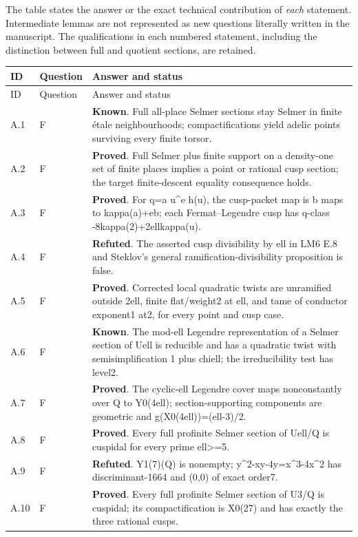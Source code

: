 The table states the answer or the exact technical contribution of
\emph{each} statement. Intermediate lemmas are not represented as new
questions literally written in the manuscript. The qualifications in
each numbered statement, including the distinction between full and
quotient sections, are retained.
\begingroup\small\setlength{\tabcolsep}{4pt}
\begin{longtable}{@{}p{}p{}p{}@{}}
\toprule ID & Question & Answer and status \\ \midrule
\endfirsthead
\toprule ID & Question & Answer and status \\ \midrule
\endhead
A.1 & F & \textbf{Known}. Full all-place Selmer sections stay Selmer in finite étale neighbourhoods; compactifications yield adelic points surviving every finite torsor. \\
A.2 & F & \textbf{Proved}. Full Selmer plus finite support on a density-one set of finite places implies a point or rational cusp section; the target finite-descent equality consequence holds. \\
A.3 & F & \textbf{Proved}. For q=a u\textasciicircum{}e h(u), the cusp-packet map is b maps to kappa(a)+eb; each Fermat--Legendre cusp has q-class -8kappa(2)+2ellkappa(u). \\
A.4 & F & \textbf{Refuted}. The asserted cusp divisibility by ell in LM6 E.8 and Steklov's general ramification-divisibility proposition is false. \\
A.5 & F & \textbf{Proved}. Corrected local quadratic twists are unramified outside 2ell, finite flat/weight2 at ell, and tame of conductor exponent1 at2, for every point and cusp case. \\
A.6 & F & \textbf{Known}. The mod-ell Legendre representation of a Selmer section of Uell is reducible and has a quadratic twist with semisimplification 1 plus chiell; the irreducibility test has level2. \\
A.7 & F & \textbf{Proved}. The cyclic-ell Legendre cover maps nonconstantly over Q to Y0(4ell); section-supporting components are geometric and g(X0(4ell))=(ell-3)/2. \\
A.8 & F & \textbf{Proved}. Every full profinite Selmer section of Uell/Q is cuspidal for every prime ell\textgreater{}=5. \\
A.9 & F & \textbf{Refuted}. Y1(7)(Q) is nonempty; y\textasciicircum{}2-xy-4y=x\textasciicircum{}3-4x\textasciicircum{}2 has discriminant-1664 and (0,0) of exact order7. \\
A.10 & F & \textbf{Proved}. Every full profinite Selmer section of U3/Q is cuspidal; its compactification is X0(27) and has exactly the three rational cusps. \\

\end{longtable}

